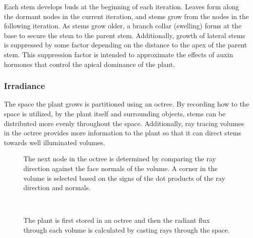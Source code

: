\documentclass[10pt]{article}
\begin{document}
Each stem develops buds at the beginning of each iteration. Leaves form along the dormant nodes in the current iteration, and stems grow from the nodes in the following iteration. As stems grow older, a branch collar (swelling) forms at the base to secure the stem to the parent stem. Additionally, growth of lateral stems is suppressed by some factor depending on the distance to the apex of the parent stem. This suppression factor is intended to approximate the effects of auxin hormones that control the apical dominance of the plant.

\subsubsection{Irradiance}
The space the plant grows is partitioned using an octree. By recording how to the space is utilized, by the plant itself and surrounding objects, stems can be distributed more evenly throughout the space. Additionally, ray tracing volumes in the octree provides more information to the plant so that it can direct stems towards well illuminated volumes.

\begin{figure}[H]
 \begin{minipage}[t]{0.48\textwidth}
  \centering
  
  \caption{The next node in the octree is determined by comparing the ray direction against the face normals of the volume. A corner in the volume is selected based on the signs of the dot products of the ray direction and normals.}
 \end{minipage}
 \hfill
 \begin{minipage}[t]{0.48\textwidth}
  \centering
   \\
  \caption{The plant is first stored in an octree and then the radiant flux through each volume is calculated by casting rays through the space.}
 \end{minipage}
\end{figure}
\end{document}
